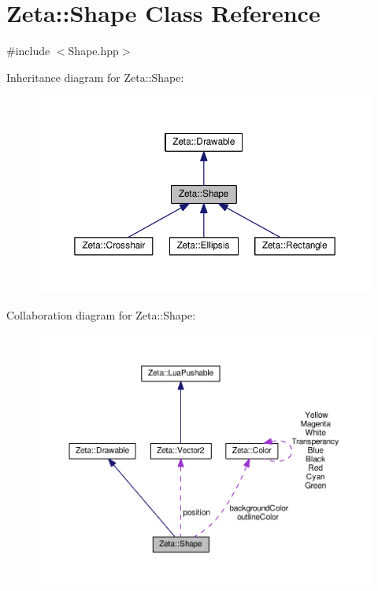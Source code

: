 \hypertarget{classZeta_1_1Shape}{\section{Zeta\+:\+:Shape Class Reference}
\label{classZeta_1_1Shape}
}


{\ttfamily \#include $<$Shape.\+hpp$>$}



Inheritance diagram for Zeta\+:\+:Shape\+:\nopagebreak
\begin{figure}[H]
\begin{center}
\leavevmode
\includegraphics[width=350pt]{classZeta_1_1Shape__inherit__graph}
\end{center}
\end{figure}


Collaboration diagram for Zeta\+:\+:Shape\+:\nopagebreak
\begin{figure}[H]
\begin{center}
\leavevmode
\includegraphics[width=350pt]{classZeta_1_1Shape__coll__graph}
\end{center}
\end{figure}
